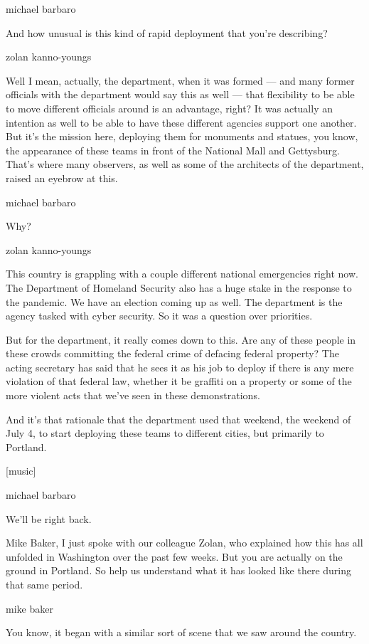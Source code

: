 michael barbaro

And how unusual is this kind of rapid deployment that you're describing?

zolan kanno-youngs

Well I mean, actually, the department, when it was formed --- and many
former officials with the department would say this as well --- that
flexibility to be able to move different officials around is an
advantage, right? It was actually an intention as well to be able to
have these different agencies support one another. But it's the mission
here, deploying them for monuments and statues, you know, the appearance
of these teams in front of the National Mall and Gettysburg. That's
where many observers, as well as some of the architects of the
department, raised an eyebrow at this.

michael barbaro

Why?

zolan kanno-youngs

This country is grappling with a couple different national emergencies
right now. The Department of Homeland Security also has a huge stake in
the response to the pandemic. We have an election coming up as well. The
department is the agency tasked with cyber security. So it was a
question over priorities.

But for the department, it really comes down to this. Are any of these
people in these crowds committing the federal crime of defacing federal
property? The acting secretary has said that he sees it as his job to
deploy if there is any mere violation of that federal law, whether it be
graffiti on a property or some of the more violent acts that we've seen
in these demonstrations.

And it's that rationale that the department used that weekend, the
weekend of July 4, to start deploying these teams to different cities,
but primarily to Portland.

{[}music{]}

michael barbaro

We'll be right back.

Mike Baker, I just spoke with our colleague Zolan, who explained how
this has all unfolded in Washington over the past few weeks. But you are
actually on the ground in Portland. So help us understand what it has
looked like there during that same period.

mike baker

You know, it began with a similar sort of scene that we saw around the
country.

